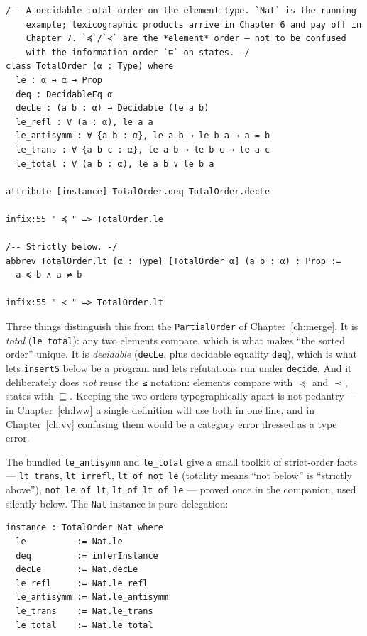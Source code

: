 \documentclass[12pt, a4paper, openright]{book}
\theoremstyle{thmstyle}
\theoremstyle{defstyle}
\newcommand{\lc}[1]{\texttt{#1}}
\newcounter{refutation}[chapter]
\begin{document}
\begin{verbatim}
/-- A decidable total order on the element type. `Nat` is the running
    example; lexicographic products arrive in Chapter 6 and pay off in
    Chapter 7. `≼`/`≺` are the *element* order — not to be confused
    with the information order `⊑` on states. -/
class TotalOrder (α : Type) where
  le : α → α → Prop
  deq : DecidableEq α
  decLe : (a b : α) → Decidable (le a b)
  le_refl : ∀ (a : α), le a a
  le_antisymm : ∀ {a b : α}, le a b → le b a → a = b
  le_trans : ∀ {a b c : α}, le a b → le b c → le a c
  le_total : ∀ (a b : α), le a b ∨ le b a

attribute [instance] TotalOrder.deq TotalOrder.decLe

infix:55 " ≼ " => TotalOrder.le

/-- Strictly below. -/
abbrev TotalOrder.lt {α : Type} [TotalOrder α] (a b : α) : Prop :=
  a ≼ b ∧ a ≠ b

infix:55 " ≺ " => TotalOrder.lt
\end{verbatim}

Three things distinguish this from the \lc{PartialOrder} of
Chapter~\ref{ch:merge}. It is \emph{total} (\lc{le_total}): any two
elements compare, which is what makes ``the sorted order'' unique. It is
\emph{decidable} (\lc{decLe}, plus decidable equality \lc{deq}), which is
what lets \lc{insertS} below be a program and lets refutations run under
\lc{decide}. And it deliberately does \emph{not} reuse the \lc{≤}
notation: elements compare with $\preccurlyeq$ and $\prec$, states with
$\sqsubseteq$. Keeping the two orders typographically apart is not
pedantry --- in Chapter~\ref{ch:lww} a single definition will use both
in one line, and in Chapter~\ref{ch:vv} confusing them would be a
category error dressed as a type error.

The bundled \lc{le_antisymm} and \lc{le_total} give a small toolkit of
strict-order facts --- \lc{lt_trans}, \lc{lt_irrefl},
\lc{lt_of_not_le} (totality means ``not below'' is ``strictly above''),
\lc{not_le_of_lt}, \lc{lt_of_lt_of_le} --- proved once in the companion,
used silently below. The \lc{Nat} instance is pure delegation:

\begin{verbatim}
instance : TotalOrder Nat where
  le          := Nat.le
  deq         := inferInstance
  decLe       := Nat.decLe
  le_refl     := Nat.le_refl
  le_antisymm := Nat.le_antisymm
  le_trans    := Nat.le_trans
  le_total    := Nat.le_total
\end{verbatim}
\end{document}
